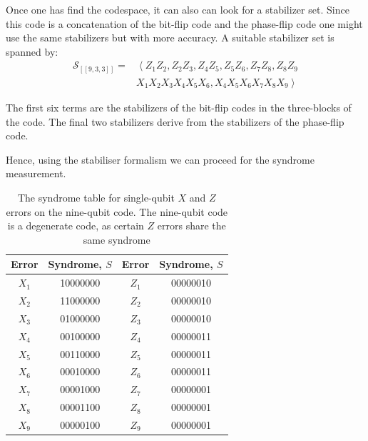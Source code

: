 Once one has find the codespace, it can also can look for a stabilizer set. Since this code is a concatenation of the bit-flip code and the phase-flip code one might use the same stabilizers but with more accuracy. 
A suitable stabilizer set is spanned by: 
\begin{equation}
\begin{aligned}
\mathcal{S}_{[[9,3,3]]}=&\left\langle Z_{1} Z_{2}, Z_{2} Z_{3}, Z_{4} Z_{5}, Z_{5} Z_{6}, Z_{7} Z_{8}, Z_{8} Z_{9}\right.\\
&\left.X_{1} X_{2} X_{3} X_{4} X_{5} X_{6}, X_{4} X_{5} X_{6} X_{7} X_{8} X_{9}\right\rangle
\end{aligned}
\end{equation}

The first six terms are the stabilizers of the bit-flip codes in the three-blocks of the code. The final two stabilizers derive from the stabilizers of the phase-flip code.

Hence, using the stabiliser formalism we can proceed for the syndrome measurement. 
\begin{table}[h]
    \centering
    \begin{tabular}{cc|cc}
\hline Error & Syndrome, $S$ & Error & Syndrome, $S$ \\
\hline$X_{1}$ & 10000000 & $Z_{1}$ & 00000010 \\
$X_{2}$ & 11000000 & $Z_{2}$ & 00000010 \\
$X_{3}$ & 01000000 & $Z_{3}$ & 00000010 \\
$X_{4}$ & 00100000 & $Z_{4}$ & 00000011 \\
$X_{5}$ & 00110000 & $Z_{5}$ & 00000011 \\
$X_{6}$ & 00010000 & $Z_{6}$ & 00000011 \\
$X_{7}$ & 00001000 & $Z_{7}$ & 00000001 \\
$X_{8}$ & 00001100 & $Z_{8}$ & 00000001 \\
$X_{9}$ & 00000100 & $Z_{9}$ & 00000001 \\
\hline
\end{tabular}
\caption{The syndrome table for single-qubit $X$ and $Z$ errors on the nine-qubit code. The nine-qubit code is a degenerate code, as certain $Z$ errors share the same syndrome}
    \label{tab:stab9}
\end{table}

